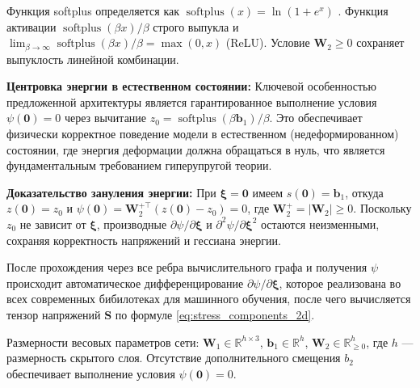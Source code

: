 Функция softplus определяется как $\operatorname{softplus}(x) = \ln(1 + e^x)$ \cite{dugas2001incorporating}. 
Функция активации $\operatorname{softplus}(\beta x)/\beta$ строго выпукла и
$\lim_{\beta\to\infty}\operatorname{softplus}(\beta x)/\beta=\max(0,x)$ (ReLU).
Условие $\mathbf{W}_2\ge 0$ сохраняет выпуклость линейной комбинации.

\textbf{Центровка энергии в естественном состоянии:} Ключевой особенностью предложенной архитектуры является 
гарантированное выполнение условия $\psi(\mathbf{0}) = 0$ через вычитание $z_0 = \operatorname{softplus}(\beta \mathbf{b}_1)/\beta$. 
Это обеспечивает физически корректное поведение модели в естественном (недеформированном) состоянии, 
где энергия деформации должна обращаться в нуль, что является фундаментальным требованием гиперупругой теории.

\textbf{Доказательство зануления энергии:} При $\boldsymbol{\xi} = \mathbf{0}$ имеем $s(\mathbf{0}) = \mathbf{b}_1$, 
откуда $z(\mathbf{0}) = z_0$ и $\psi(\mathbf{0}) = \mathbf{W}_2^{+\top}(z(\mathbf{0}) - z_0) = 0$, 
где $\mathbf{W}_2^+ = |\mathbf{W}_2| \geq 0$. Поскольку $z_0$ не зависит от $\boldsymbol{\xi}$, 
производные $\partial\psi/\partial\boldsymbol{\xi}$ и $\partial^2\psi/\partial\boldsymbol{\xi}^2$ 
остаются неизменными, сохраняя корректность напряжений и гессиана энергии. 

После прохождения через все ребра вычислительного графа 
и получения $\psi$ происходит автоматическое дифференцирование $\partial\psi/\partial\boldsymbol{\xi}$, 
которое реализована во всех современных бибилотеках для машинного обучения,
после чего вычисляется тензор напряжений $\mathbf{S}$ по формуле \eqref{eq:stress_components_2d}.

Размерности весовых параметров сети: $\mathbf{W}_1 \in \mathbb{R}^{h \times 3}$, $\mathbf{b}_1 \in \mathbb{R}^{h}$,
 $\mathbf{W}_2 \in \mathbb{R}^{h}_{\geq 0}$, где $h$ — размерность скрытого слоя. Отсутствие дополнительного смещения $b_2$ 
 обеспечивает выполнение условия $\psi(\mathbf{0}) = 0$.





